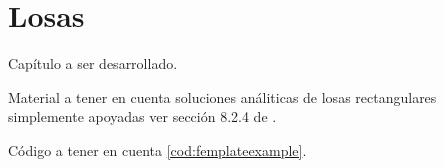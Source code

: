 %
%
%

\chapter{Losas}

Capítulo a ser desarrollado.

Material a tener en cuenta soluciones análiticas de losas rectangulares simplemente apoyadas ver sección 8.2.4 de \citep{Reddy2002b}.

Código a tener en cuenta \ref{cod:femplateexample}.
